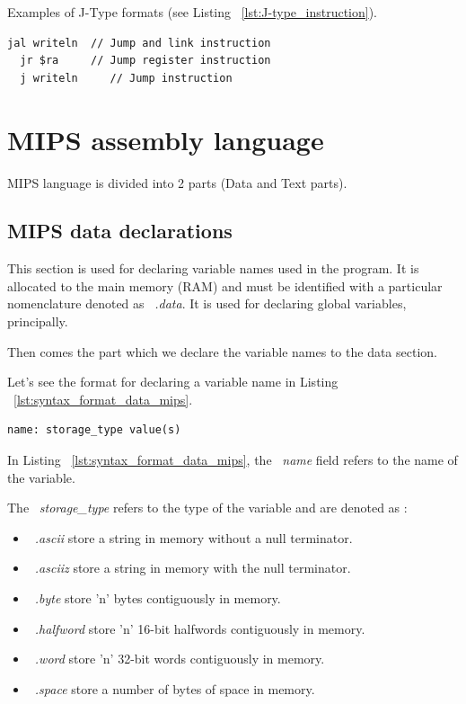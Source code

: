 \documentclass[
  oneside,
  11pt, a4paper,
  footinclude=true,
  headinclude=true,
  cleardoublepage=empty
]{scrbook}
\begin{document}
Examples of J-Type formats (see Listing ~\ref{lst:J-type_instruction}).

\begin{lstlisting}[caption={Examples of J-Type instruction},label={lst:J-type_instruction}]
  jal writeln  // Jump and link instruction
  jr $ra	 // Jump register instruction
  j writeln     // Jump instruction
\end{lstlisting}


\section{MIPS assembly language}

MIPS language is divided into 2 parts (Data and Text parts).

\subsection{MIPS data declarations}

This section is used for declaring variable names used in the program.
It is allocated to the main memory (RAM) and must be identified with a particular nomenclature denoted as ~\textit{.data}. It is used for declaring global variables, principally.

Then comes the part which we declare the variable names to the data section.

Let's see the format for declaring a variable name in Listing ~\ref{lst:syntax_format_data_mips}.

\begin{lstlisting}[caption={Syntax format of data declarations in MIPS},label={lst:syntax_format_data_mips}]
  name: storage_type value(s)
\end{lstlisting}

In Listing ~\ref{lst:syntax_format_data_mips}, the ~\textit{name} field refers to the name of the variable. 

The ~\textit{storage\_type} refers to the type of the variable and are denoted as :
\begin{itemize}
\item ~\textit{.ascii} store a string in memory without a null terminator.
\item ~\textit{.asciiz} store a string in memory with the null terminator.
\item ~\textit{.byte} store 'n' bytes contiguously in memory.
\item ~\textit{.halfword} store 'n' 16-bit halfwords contiguously in memory.
\item ~\textit{.word} store 'n' 32-bit words contiguously in memory.
\item ~\textit{.space} store a number of bytes of space in memory.
\end{itemize}
\end{document}
